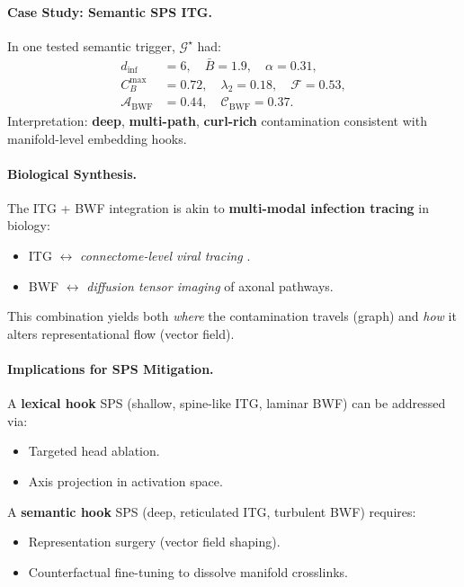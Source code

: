 \documentclass[11pt]{article}
\begin{document}
\paragraph{Case Study: Semantic SPS ITG.}
In one tested semantic trigger, $\mathcal{G}^\star$ had:
\begin{align*}
d_{\mathrm{inf}} &= 6, \quad \bar{B} = 1.9, \quad \alpha = 0.31, \\
C_B^{\max} &= 0.72, \quad \lambda_2 = 0.18, \quad \mathcal{F} = 0.53, \\
\mathcal{A}_{\mathrm{BWF}} &= 0.44, \quad \mathcal{C}_{\mathrm{BWF}} = 0.37.
\end{align*}
Interpretation: \textbf{deep}, \textbf{multi-path}, \textbf{curl-rich} contamination consistent with manifold-level embedding hooks.

\paragraph{Biological Synthesis.}
The ITG + BWF integration is akin to \textbf{multi-modal infection tracing} in biology:
\begin{itemize}
    \item ITG $\leftrightarrow$ \emph{connectome-level viral tracing} \citep{wickersham2007monosynaptic}.
    \item BWF $\leftrightarrow$ \emph{diffusion tensor imaging} of axonal pathways.
\end{itemize}
This combination yields both \emph{where} the contamination travels (graph) and \emph{how} it alters representational flow (vector field).

\paragraph{Implications for SPS Mitigation.}
A \textbf{lexical hook} SPS (shallow, spine-like ITG, laminar BWF) can be addressed via:
\begin{itemize}
    \item Targeted head ablation.
    \item Axis projection in activation space.
\end{itemize}
A \textbf{semantic hook} SPS (deep, reticulated ITG, turbulent BWF) requires:
\begin{itemize}
    \item Representation surgery (vector field shaping).
    \item Counterfactual fine-tuning to dissolve manifold crosslinks.
\end{itemize}
\end{document}
